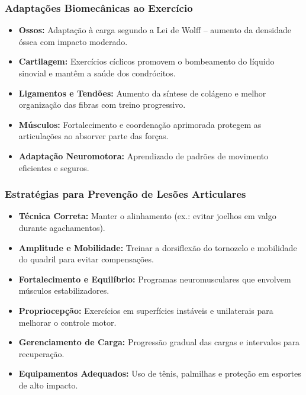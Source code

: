\documentclass{beamer}
\begin{document}
\begin{frame}
\frametitle{Adaptações Biomecânicas ao Exercício}
\begin{itemize}
    \item \textbf{Ossos:} Adaptação à carga segundo a Lei de Wolff – aumento da densidade óssea com impacto moderado.
    \item \textbf{Cartilagem:} Exercícios cíclicos promovem o bombeamento do líquido sinovial e mantêm a saúde dos condrócitos.
    \item \textbf{Ligamentos e Tendões:} Aumento da síntese de colágeno e melhor organização das fibras com treino progressivo.
    \item \textbf{Músculos:} Fortalecimento e coordenação aprimorada protegem as articulações ao absorver parte das forças.
    \item \textbf{Adaptação Neuromotora:} Aprendizado de padrões de movimento eficientes e seguros.
\end{itemize}
\end{frame}

\begin{frame}
\frametitle{Estratégias para Prevenção de Lesões Articulares}
\begin{itemize}
    \item \textbf{Técnica Correta:} Manter o alinhamento (ex.: evitar joelhos em valgo durante agachamentos).
    \item \textbf{Amplitude e Mobilidade:} Treinar a dorsiflexão do tornozelo e mobilidade do quadril para evitar compensações.
    \item \textbf{Fortalecimento e Equilíbrio:} Programas neuromusculares que envolvem músculos estabilizadores.
    \item \textbf{Propriocepção:} Exercícios em superfícies instáveis e unilaterais para melhorar o controle motor.
    \item \textbf{Gerenciamento de Carga:} Progressão gradual das cargas e intervalos para recuperação.
    \item \textbf{Equipamentos Adequados:} Uso de tênis, palmilhas e proteção em esportes de alto impacto.
\end{itemize}
\end{frame}
\end{document}
